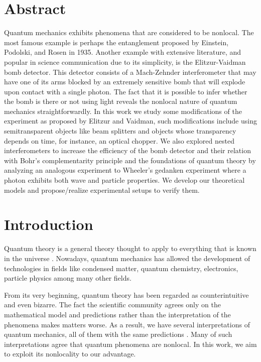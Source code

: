 \documentclass[12pt]{book}
\newcommand\blankpage{
    \null
    \thispagestyle{empty}
    \addtocounter{page}{0}
    \newpage
    }
\begin{document}
\chapter*{Abstract}
\thispagestyle{plain}
Quantum mechanics exhibits phenomena that are considered to be nonlocal. The most famous example is perhaps the entanglement proposed by Einstein, Podolski, and Rosen in 1935. Another example with extensive literature, and popular in science communication due to its simplicity, is the Elitzur-Vaidman bomb detector. This detector consists of a Mach-Zehnder interferometer that may have one of its arms blocked by an extremely sensitive bomb that will explode upon contact with a single photon. The fact that it is possible to infer whether the bomb is there or not using light reveals the nonlocal nature of quantum mechanics straightforwardly. In this work we study some modifications of the experiment as proposed by Elitzur and Vaidman, such modifications include using semitransparent objects like beam splitters and objects whose transparency depends on time, for instance, an optical chopper. We also explored nested interferometers to increase the efficiency of the bomb detector and their relation with Bohr's complementarity principle and the foundations of quantum theory by analyzing an analogous experiment to Wheeler's gedanken experiment where a photon exhibits both wave and particle properties. We develop our theoretical models and propose/realize experimental setups to verify them. 


\pagebreak


\blankpage{}

\chapter*{Introduction}
\thispagestyle{plain}

Quantum theory is a general theory thought to apply to everything that is known in the universe \cite{balentine}. Nowadays, quantum mechanics has allowed the development of technologies in fields like condensed matter, quantum chemistry, electronics, particle physics among many other fields.

From its very beginning, quantum theory has been regarded as counterintuitive and even bizarre. The fact the scientific community agrees only on the mathematical model and predictions rather than the interpretation of the phenomena makes matters worse. As a result, we have several interpretations of quantum mechanics, all of them with the same predictions \cite{interpre}. Many of such interpretations agree that quantum phenomena are nonlocal. In this work, we aim to exploit its nonlocality to our advantage.
\end{document}
